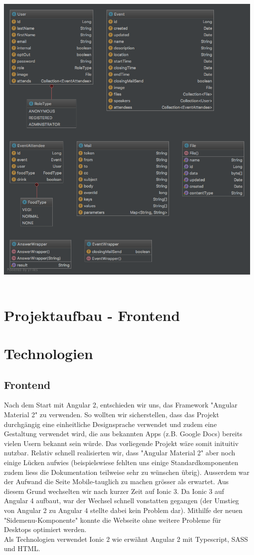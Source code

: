 \documentclass[11pt]{article} %
\begin{document}
\includegraphics[width=1.0\textwidth]{class-diagrams/Scheduler-domain}
\\
\\


\newpage
\section{Projektaufbau - Frontend}

\newpage
\section{Technologien}

\subsection{Frontend}
Nach dem Start mit Angular 2, entschieden wir uns, das Framework "Angular Material 2" zu verwenden. So wollten wir sicherstellen, dass das Projekt durchgängig eine einheitliche Designsprache verwendet und zudem eine Gestaltung verwendet wird, die aus bekannten Apps (z.B. Google Docs) bereits vielen Usern bekannt sein würde. Das vorliegende Projekt wäre somit inituitiv nutzbar. Relativ schnell realisierten wir, dass "Angular Material 2" aber noch einige Lücken aufwies (beispielswiese fehlten uns einige Standardkomponenten zudem liess die Dokumentation teilweise sehr zu wünschen übrig). Ausserdem war der Aufwand die Seite Mobile-tauglich zu machen grösser als erwartet. Aus diesem Grund wechselten wir nach kurzer Zeit auf Ionic 3. Da Ionic 3 auf Angular 4 aufbaut, war der Wechsel schnell vonstatten gegangen (der Umstieg von Angular 2 zu Angular 4 stellte dabei kein Problem dar). Mithilfe der neuen "Sidemenu-Komponente" konnte die Webseite ohne weitere Probleme für Desktops optimiert werden.
\\
Als Technologien verwendet Ionic 2 wie erwähnt Angular 2 mit Typescript, SASS und HTML.
\end{document}
